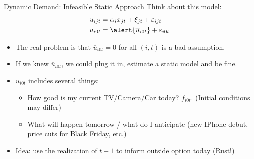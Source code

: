 \documentclass[xcolor=pdftex,dvipsnames,table,mathserif,aspectratio=169]{beamer}
\begin{document}
\begin{frame}{Dynamic Demand: Infeasible Static Approach}
Think about this model:
\begin{align*}
u_{ijt} &=   \alpha_i x_{jt}  +  \xi_{jt} + \varepsilon_{ijt}\\
u_{i0t} &=  \alert{\overline{u}_{i0t}} + \varepsilon_{i0t} 
\end{align*}
\vspace{-0.5cm}
\begin{itemize}
\item The real problem is that $\overline{u}_{i0t}=0$ for all $(i,t)$ is a bad assumption.
\item If we knew $\overline{u}_{i0t}$, we could plug it in, estimate a static model and be fine.
\item $\overline{u}_{i0t}$ includes several things:
\begin{itemize}
	\item How good is my current TV/Camera/Car today? $f_{i0t}$. (Initial conditions may differ)
	\item What will happen tomorrow / what do I anticipate (new IPhone debut, price cuts for Black Friday, etc.)
\end{itemize}
\item \alert{Idea: use the realization of $t+1$ to inform outside option today (Rust!)}
\end{itemize}
\end{frame}
\end{document}

